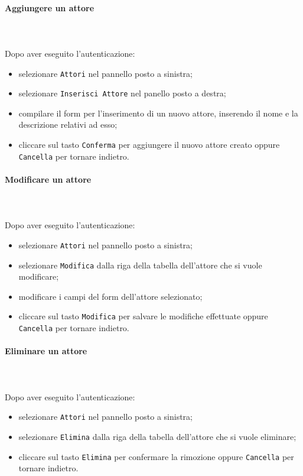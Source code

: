 	\paragraph{Aggiungere un attore} \mbox{}\\ \mbox{}\\
	Dopo aver eseguito l'autenticazione:
	\begin{itemize}
		\item selezionare \texttt{Attori} nel pannello posto a sinistra;
		\item selezionare \texttt{Inserisci Attore} nel panello posto a destra;
		\item compilare il form per l'inserimento di un nuovo attore, inserendo 
		il nome e la descrizione relativi ad esso;
		\item cliccare sul tasto \texttt{Conferma} per aggiungere il nuovo attore 
		creato oppure \texttt{Cancella} per tornare indietro.	
	\end{itemize}
	
	\paragraph{Modificare un attore} \mbox{}\\ \mbox{}\\
	Dopo aver eseguito l'autenticazione:
	\begin{itemize}
		\item selezionare \texttt{Attori} nel pannello posto a sinistra;
		\item selezionare \texttt{Modifica} dalla riga della tabella dell'attore
		che si vuole modificare;
		\item modificare i campi del form dell'attore selezionato;
		\item cliccare sul tasto \texttt{Modifica} per salvare le modifiche effettuate
		oppure \texttt{Cancella} per tornare indietro.	
	\end{itemize}
	
	\paragraph{Eliminare un attore} \mbox{}\\ \mbox{}\\
	Dopo aver eseguito l'autenticazione:
	\begin{itemize}
		\item selezionare \texttt{Attori} nel pannello posto a sinistra;
		\item selezionare \texttt{Elimina} dalla riga della tabella dell'attore
		che si vuole eliminare;
		\item cliccare sul tasto \texttt{Elimina} per confermare la rimozione
		oppure \texttt{Cancella} per tornare indietro.	
	\end{itemize}
	
